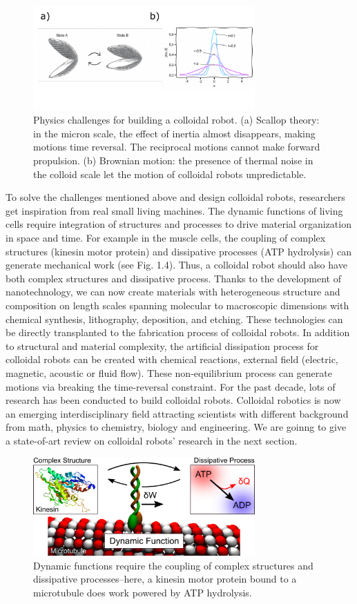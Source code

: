 \begin{figure}
\centering
\includegraphics[width=8.5cm]{figures/1_3.pdf}
\caption{Physics challenges for building a colloidal robot. (a) Scallop theory: in the micron scale, the effect of inertia almost disappears, making motions time reversal. The reciprocal motions cannot make forward propulsion.  (b) Brownian motion: the presence of thermal noise in the colloid scale let the motion of colloidal robots unpredictable.}
\label{fig:1.3}
\end{figure}
To solve the  challenges mentioned above and design colloidal robots, researchers get inspiration from real small living  machines. The dynamic functions of living cells require integration of structures and processes to drive material organization in space and time. For example in the muscle cells,  the coupling of complex structures (kinesin motor protein) and dissipative processes (ATP hydrolysis) can generate mechanical work (see Fig. 1.4). Thus, a colloidal robot should also have both complex structures and dissipative process. Thanks to the development of nanotechnology, we can now create materials with heterogeneous structure and composition on length scales spanning molecular to macroscopic dimensions with chemical synthesis, lithography, deposition, and etching. These technologies can be directly transplanted to the fabrication process of colloidal robots. In addition to structural and material complexity, the artificial dissipation process for colloidal robots  can be created with chemical reactions, external field (electric, magnetic, acoustic or fluid flow). These non-equilibrium process can generate motions via breaking the time-reversal constraint. For the past decade, lots of research has been conducted to build colloidal robots. Colloidal robotics is now an emerging interdisciplinary field attracting scientists with different background from math, physics to chemistry, biology and engineering. We are goinng to give a state-of-art  review on colloidal robots' research in the next section.
\begin{figure}
\centering
\includegraphics[width=8.5cm]{figures/1_4.png}
\caption{Dynamic functions require the coupling of complex structures and dissipative processes–here, a kinesin motor protein bound to a microtubule  does work powered by ATP hydrolysis.}
\label{fig:1.4}
\end{figure}

